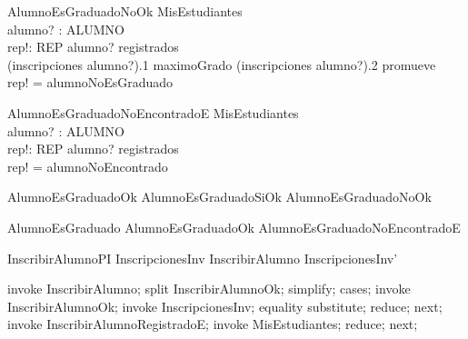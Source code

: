 \begin{schema}{AlumnoEsGraduadoNoOk}
    \Xi MisEstudiantes \\
    alumno? : ALUMNO \\
    rep!: REP
    \where
    alumno? \in registrados \\
    (inscripciones alumno?).1 \neq maximoGrado \lor (inscripciones alumno?).2 \neq promueve \\
    rep! = alumnoNoEsGraduado
\end{schema}

\begin{schema}{AlumnoEsGraduadoNoEncontradoE}
    \Xi MisEstudiantes \\
    alumno? : ALUMNO \\
    rep!: REP
    \where
    alumno? \notin registrados \\
    rep! = alumnoNoEncontrado
\end{schema}

\begin{zed}
    AlumnoEsGraduadoOk  AlumnoEsGraduadoSiOk \lor AlumnoEsGraduadoNoOk
\end{zed}
\begin{zed}
    AlumnoEsGraduado  AlumnoEsGraduadoOk \lor AlumnoEsGraduadoNoEncontradoE
\end{zed}


\begin{theorem}{InscribirAlumnoPI}
    InscripcionesInv \land InscribirAlumno \implies InscripcionesInv'
\end{theorem}

\begin{zproof}[InscribirAlumnoPI]
    invoke InscribirAlumno;
    split InscribirAlumnoOk;
    simplify;
    cases;
    invoke InscribirAlumnoOk;
    invoke InscripcionesInv;
    equality substitute;
    reduce;
    next;
    invoke InscribirAlumnoRegistradoE;
    invoke \Xi MisEstudiantes;
    reduce;
    next;
\end{zproof}

